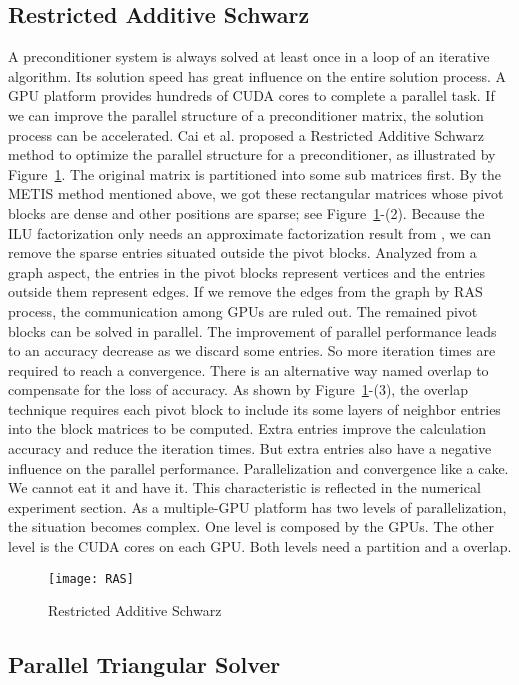 \documentclass[runningheads,a4paper]{llncs}
\begin{document}
{\subsection{Restricted Additive Schwarz}
A preconditioner system is always solved at least once in a loop of an iterative algorithm. Its solution speed has great influence on the entire solution process. A GPU platform provides hundreds of CUDA cores to complete a parallel task. If we can improve the parallel structure of a preconditioner matrix, the solution process can be accelerated. Cai et al. proposed a Restricted Additive Schwarz method to optimize the parallel structure for a preconditioner, as illustrated by Figure~\ref{fig_RAS}. The original matrix  is partitioned into some sub matrices first. By the METIS method mentioned above, we got these rectangular matrices whose pivot blocks are dense and other positions are sparse; see Figure~\ref{fig_RAS}-(2). Because the ILU factorization only needs an approximate factorization result from , we can remove the sparse entries situated outside the pivot blocks. Analyzed from a graph aspect, the entries in the pivot blocks represent vertices and the entries outside them represent edges. If we remove the edges from the graph by RAS process, the communication among GPUs are ruled out. The remained pivot blocks can be solved in parallel. The improvement of parallel performance leads to an accuracy decrease as we discard some entries. So more iteration times are required to reach a convergence. There is an alternative way named overlap to compensate for the loss of accuracy. As shown by Figure~\ref{fig_RAS}-(3), the overlap technique requires each pivot block to include its some layers of neighbor entries into the block matrices to be computed. Extra entries improve the calculation accuracy and reduce the iteration times. But extra entries also have a negative influence on the parallel performance. Parallelization and convergence like a cake. We cannot eat it and have it. This characteristic is reflected in the numerical experiment section. As a multiple-GPU platform has two levels of parallelization, the situation becomes complex. One level is composed by the GPUs. The other level is the CUDA cores on each GPU. Both levels need a partition and a overlap.

\begin{figure}[!tbh]
    \centering
    \texttt{[image: RAS]}
    \caption{Restricted Additive Schwarz}
    \label{fig_RAS}
\end{figure}
\subsection{Parallel Triangular Solver}

}
\end{document}
